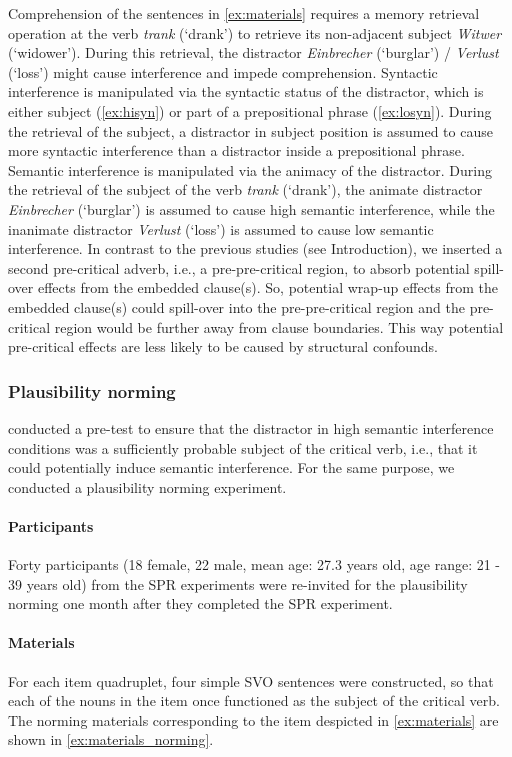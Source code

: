 \documentclass[a4paper, man, floatsintext]{apa7}
\begin{document}
Comprehension of the sentences in \ref{ex:materials} requires a memory retrieval operation at the verb \textit{trank} (`drank') to retrieve its non-adjacent subject \textit{Witwer} (`widower'). During this retrieval, the distractor \textit{Einbrecher} (`burglar') / \textit{Verlust} (`loss') might cause interference and impede comprehension. Syntactic interference is manipulated via the syntactic status of the distractor, which is either subject (\ref{ex:hisyn}) or part of a prepositional phrase (\ref{ex:losyn}). During the retrieval of the subject, a distractor in subject position is assumed to cause more syntactic interference than a distractor inside a prepositional phrase. Semantic interference is manipulated via the animacy of the distractor. During the retrieval of the subject of the verb \textit{trank} (`drank'), the animate distractor  \textit{Einbrecher} (`burglar') is assumed to cause high semantic interference, while the inanimate distractor \textit{Verlust} (`loss') is assumed to cause low semantic interference. In contrast to the previous studies (see Introduction), we inserted a second pre-critical adverb, i.e., a pre-pre-critical region, to absorb potential spill-over effects from the embedded clause(s). So, potential wrap-up effects from the embedded clause(s) could spill-over into the pre-pre-critical region and the pre-critical region would be further away from clause boundaries. This way potential pre-critical effects are less likely to be caused by structural confounds.

\subsubsection{Plausibility norming}
\citeauthor{vandyke07} conducted a pre-test to ensure that the distractor in high semantic interference conditions was a sufficiently probable subject of the critical verb, i.e., that it could potentially induce semantic interference. For the same purpose, we conducted a plausibility norming experiment.

\paragraph{Participants}
Forty participants (18 female, 22 male, mean age: 27.3 years old, age range: 21 - 39 years old) from the SPR experiments were re-invited for the plausibility norming one month after they completed the SPR experiment.

\paragraph{Materials}
For each item quadruplet, four simple SVO sentences were constructed, so that each of the nouns in the item once functioned as the subject of the critical verb. The norming materials corresponding to the item despicted in \ref{ex:materials} are shown in \ref{ex:materials_norming}.
\end{document}
